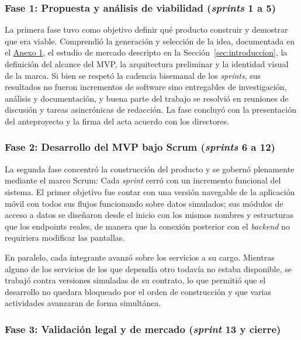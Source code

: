 \subsubsection{Fase 1: Propuesta y análisis de viabilidad (\textit{sprints} 1 a 5)}

La primera fase tuvo como objetivo definir qué producto construir y demostrar que era viable. Comprendió la generación y selección de la idea, documentada en el \hyperref[anexo:seleccion]{Anexo 1}, el estudio de mercado descripto en la Sección~\ref{sec:introduccion}, la definición del alcance del MVP, la arquitectura preliminar y la identidad visual de la marca. Si bien se respetó la cadencia bisemanal de los \textit{sprints}, sus resultados no fueron incrementos de software sino entregables de investigación, análisis y documentación, y buena parte del trabajo se resolvió en reuniones de discusión y tareas asincrónicas de redacción. La fase concluyó con la presentación del anteproyecto y la firma del acta acuerdo con los directores.

\subsubsection{Fase 2: Desarrollo del MVP bajo Scrum (\textit{sprints} 6 a 12)}

La segunda fase concentró la construcción del producto y se gobernó plenamente mediante el marco Scrum: Cada \textit{sprint} cerró con un incremento funcional del sistema. El primer objetivo fue contar con una versión navegable de la aplicación móvil con todos sus flujos funcionando sobre datos simulados; sus módulos de acceso a datos se diseñaron desde el inicio con los mismos nombres y estructuras que los endpoints reales, de manera que la conexión posterior con el \textit{backend} no requiriera modificar las pantallas.

En paralelo, cada integrante avanzó sobre los servicios a su cargo. Mientras alguno de los servicios de los que dependía otro todavía no estaba disponible, se trabajó contra versiones simuladas de su contrato, lo que permitió que el desarrollo no quedara bloqueado por el orden de construcción y que varias actividades avanzaran de forma simultánea.

\subsubsection{Fase 3: Validación legal y de mercado (\textit{sprint} 13 y cierre)}

